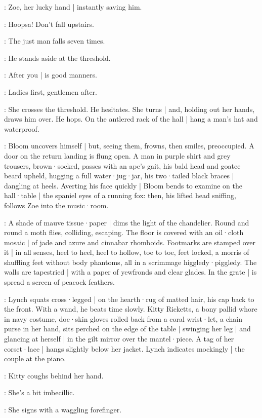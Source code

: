 :
Zoe,
her lucky hand |
instantly saving him.

\Zoe:
Hoopsa!
Don't fall upstairs.

\Bloom:
The just man falls seven times.

:
He stands aside at the threshold.

\Bloom:
After you |
is good manners.

\Zoe:
Ladies first,
gentlemen after.

:
She crosses the threshold.
He hesitates.
She turns |
and,
holding out her hands,
draws him over.
He hops.
On the antlered rack of the hall |
hang a man's hat and waterproof.

:
Bloom uncovers himself |
but,
seeing them,
frowns,
then smiles,
preoccupied.
A door on the return landing is flung open.
A man in purple shirt and grey trousers,
brown·socked,
passes with an ape's gait,
his bald head and goatee beard upheld,
hugging a full water·jug·jar,
his two·tailed black braces |
dangling at heels.
Averting his face quickly |
Bloom bends to examine on the hall·table |
the spaniel eyes of a running fox:
then,
his lifted head sniffing,
follows Zoe into the music·room.

:
A shade of mauve tissue·paper |
dims the light of the chandelier.
Round and round a moth flies,
colliding,
escaping.
The floor is covered with an oil·cloth mosaic |
of jade and azure and cinnabar rhomboids.
Footmarks are stamped over it |
in all senses,
heel to heel,
heel to hollow,
toe to toe,
feet locked,
a morris of shuffling feet without body phantoms,
all in a scrimmage higgledy·piggledy.
The walls are tapestried |
with a paper of yewfronds and clear glades.
In the grate |
is spread a screen of peacock feathers.

:
Lynch squats cross·legged |
on the hearth·rug of matted hair,
his cap back to the front.
With a wand,
he beats time slowly.
Kitty Ricketts,
a bony pallid whore in navy costume,
doe·skin gloves rolled back from a coral wrist·let,
a chain purse in her hand,
sits perched on the edge of the table |
swinging her leg |
and glancing at herself |
in the gilt mirror over the mantel·piece.
A tag of her corset·lace |
hangs slightly below her jacket.
Lynch indicates mockingly |
the couple at the piano.

:
Kitty coughs behind her hand.

\Kitty:
She's a bit imbecillic.

:
She signs with a waggling forefinger.

